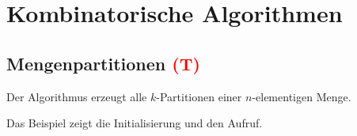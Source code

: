 \section{Kombinatorische Algorithmen}

\subsection{Mengenpartitionen \textcolor{red}{(T)}} %
Der Algorithmus erzeugt alle $k$-Partitionen einer $n$-elementigen Menge.

Das Beispiel zeigt die Initialisierung und den Aufruf.

